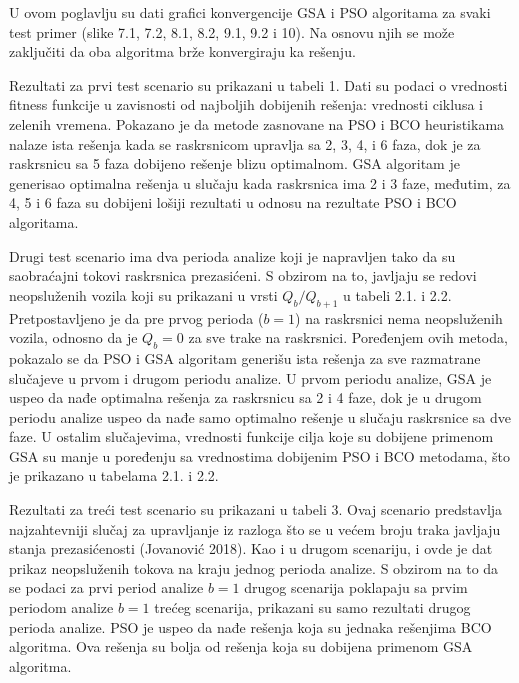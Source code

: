 U ovom poglavlju su dati grafici konvergencije GSA i PSO algoritama za svaki test primer (slike 7.1, 7.2, 8.1, 8.2, 9.1, 9.2 i 10). Na osnovu njih se može zaključiti da oba algoritma brže konvergiraju ka rešenju.

Rezultati za prvi test scenario su prikazani u tabeli 1. Dati su podaci o vrednosti fitness funkcije u zavisnosti od najboljih dobijenih rešenja: vrednosti ciklusa i zelenih vremena. Pokazano je da metode zasnovane na PSO i BCO heuristikama nalaze ista rešenja kada se raskrsnicom upravlja sa 2, 3, 4, i 6 faza, dok je za raskrsnicu sa 5 faza dobijeno rešenje blizu optimalnom. GSA algoritam je generisao optimalna rešenja u slučaju kada raskrsnica ima 2 i 3 faze, međutim, za 4, 5 i 6 faza su dobijeni lošiji rezultati u odnosu na rezultate PSO i BCO algoritama. 


Drugi test scenario ima dva perioda analize koji je napravljen tako da su saobraćajni tokovi raskrsnica prezasićeni. S obzirom na to, javljaju se redovi neopsluženih vozila koji su prikazani u vrsti $Q_b / Q_{b+1}$ u tabeli 2.1. i 2.2. Pretpostavljeno je da pre prvog perioda ($b=1$) na raskrsnici nema neopsluženih vozila, odnosno da je $Q_b = 0$ za sve trake na raskrsnici. Poređenjem ovih metoda, pokazalo se da PSO i GSA algoritam generišu ista rešenja za sve razmatrane slučajeve u prvom i drugom periodu analize. U prvom periodu analize, GSA je uspeo da nađe optimalna rešenja za raskrsnicu sa 2 i 4 faze, dok je u drugom periodu analize uspeo da nađe samo optimalno rešenje u slučaju raskrsnice sa dve faze. U ostalim slučajevima, vrednosti funkcije cilja koje su dobijene primenom GSA su manje u poređenju sa vrednostima dobijenim PSO i BCO metodama, što je prikazano u tabelama 2.1. i 2.2. 


Rezultati za treći test scenario su prikazani u tabeli 3. Ovaj scenario predstavlja najzahtevniji slučaj za upravljanje iz razloga što se u većem broju traka javljaju stanja prezasićenosti (Jovanović 2018). Kao i u drugom scenariju, i ovde je dat prikaz neopsluženih tokova na kraju jednog perioda analize. S obzirom na to da se podaci za prvi period analize $b=1$ drugog scenarija poklapaju sa prvim periodom analize $b=1$ trećeg scenarija, prikazani su samo rezultati drugog perioda analize. PSO je uspeo da nađe rešenja koja su jednaka rešenjima BCO algoritma. Ova rešenja su bolja od rešenja koja su dobijena primenom GSA algoritma. 

